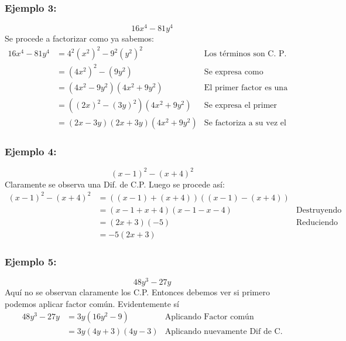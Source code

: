 \documentclass[10pt,twoside]{article}
\begin{document}
\subsubsection*{Ejemplo 3:} 
\[16x^{4}-81y^{4}\]
Se procede a factorizar como ya sabemos:
\begin{align*}
16x^{4}-81y^{4}&=4^{2}(x^{2})^{2}-9^{2}(y^{2})^{2} & \mbox{Los términos son C. P.}\\
&=(4x^{2})^{2}-(9y^{2}) & \mbox{Se expresa como diferencia de C.P.}\\
&=(4x^{2}-9y^{2})(4x^{2}+9y^{2}) & \mbox{El primer factor es una Dif. de C.P.}\\
&=\left((2x)^{2}-(3y)^{2}\right)(4x^{2}+9y^{2}) & \mbox{Se expresa el primer factor como una D. de C.P.}\\
&=(2x-3y)(2x+3y)(4x^{2}+9y^{2}) & \mbox{Se factoriza a su vez el 1er factor}
\end{align*}
\subsubsection*{Ejemplo 4:}
\[(x-1)^{2}-(x+4)^{2}\]
Claramente se observa una Dif. de C.P. Luego se procede así:
\begin{align*}
(x-1)^{2}-(x+4)^{2}&=\left((x-1)+(x+4)\right)\left((x-1)-(x+4)\right)\\
&=(x-1+x+4)(x-1-x-4) & \mbox{Destruyendo los paréntesis internos}\\
&=(2x+3)(-5) & \mbox{Reduciendo términos semejantes}\\
&=-5(2x+3)
\end{align*}
\subsubsection*{Ejemplo 5:}
\[48y^{3}-27y\]
Aquí no se observan claramente los C.P. Entonces debemos ver si primero podemos aplicar factor común. Evidentemente sí
\begin{align*}
48y^{3}-27y&=3y(16y^{2}-9) & \mbox{Aplicando Factor común}\\
&=3y(4y+3)(4y-3) & \mbox{Aplicando nuevamente Dif de C.}
\end{align*}
\end{document}

